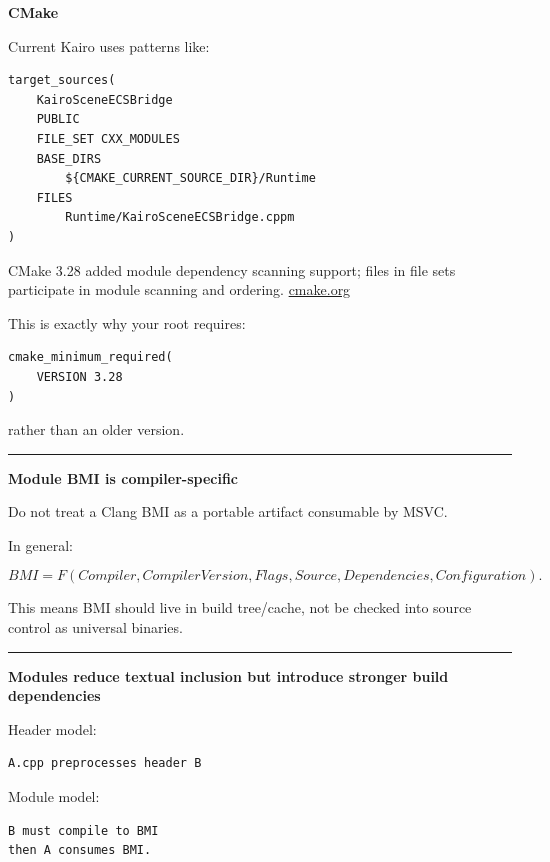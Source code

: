 \textbf{CMake }

Current Kairo uses patterns like:

\begin{verbatim}
target_sources(
    KairoSceneECSBridge
    PUBLIC
    FILE_SET CXX_MODULES
    BASE_DIRS
        ${CMAKE_CURRENT_SOURCE_DIR}/Runtime
    FILES
        Runtime/KairoSceneECSBridge.cppm
)
\end{verbatim}

CMake 3.28 added module dependency scanning support; files in  file sets participate in module scanning and ordering. \href{https://cmake.org/cmake/help/git-stage/manual/cmake-cxxmodules.7.html?utm_source=chatgpt.com}{cmake.org}

This is exactly why your root requires:

\begin{verbatim}
cmake_minimum_required(
    VERSION 3.28
)
\end{verbatim}

rather than an older version.

\begin{center}\rule{0.5\linewidth}{0.5pt}\end{center}

\textbf{Module BMI is compiler-specific}

Do not treat a Clang BMI as a portable artifact consumable by MSVC.

In general:

\[
BMI=
F(
Compiler,
CompilerVersion,
Flags,
Source,
Dependencies,
Configuration
).
\]

This means BMI should live in build tree/cache, not be checked into source control as universal binaries.

\begin{center}\rule{0.5\linewidth}{0.5pt}\end{center}

\textbf{Modules reduce textual inclusion but introduce stronger build dependencies}

Header model:

\begin{verbatim}
A.cpp preprocesses header B
\end{verbatim}

Module model:

\begin{verbatim}
B must compile to BMI
then A consumes BMI.
\end{verbatim}

